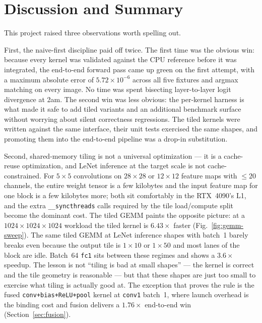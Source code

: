 \documentclass[conference]{IEEEtran}
\begin{document}
\section{Discussion and Summary}
\label{sec:discussion}
This project raised three observations worth spelling out.

First, the naive-first discipline paid off twice. The first time was
the obvious win: because every kernel was validated against the CPU
reference before it was integrated, the end-to-end
forward pass came up green on the first attempt, with a maximum
absolute error of $5.72\times10^{-6}$ across all five fixtures and
argmax matching on every image. No time was spent bisecting
layer-to-layer logit divergence at 2am. The second win was less
obvious: the per-kernel harness is what made it safe to add tiled
variants and an additional benchmark surface without worrying about
silent correctness regressions. The tiled kernels were written
against the same interface, their unit tests exercised the same
shapes, and promoting them into the end-to-end pipeline was a
drop-in substitution.

Second, shared-memory tiling is not a universal optimization --- it
is a cache-reuse optimization, and LeNet inference at the target
scale is not cache-constrained. For $5\times5$ convolutions on
$28\times28$ or $12\times12$ feature maps with $\leq20$ channels,
the entire weight tensor is a few kilobytes and the input feature
map for one block is a few kilobytes more; both sit comfortably in
the RTX~4090's L1, and the extra \texttt{\_\_syncthreads} calls
required by the tile load/compute split become the dominant cost.
The tiled GEMM paints the opposite picture: at a
$1024\times1024\times1024$ workload the tiled kernel is $6.43\times$
faster (Fig.~\ref{fig:gemm-sweep}). The same tiled GEMM at LeNet inference shapes
with batch~1 barely breaks even because the output tile is $1\times10$
or $1\times50$ and most lanes of the block are idle. Batch~64
\texttt{fc1} sits between these regimes and shows a $3.6\times$
speedup. The lesson is not ``tiling is bad at small shapes'' --- the
kernel is correct and the tile geometry is reasonable --- but that these shapes are just too small to exercise what tiling is actually good at. The exception that proves the rule is the
fused \texttt{conv+bias+ReLU+pool} kernel at \texttt{conv1} batch~1,
where launch overhead is the binding cost and fusion delivers a
$1.76\times$ end-to-end win (Section~\ref{sec:fusion}).
\end{document}
